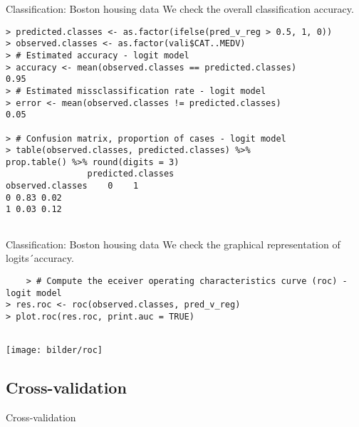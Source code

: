 \documentclass{beamer}
\begin{document}
\begin{frame}[fragile]{Classification: Boston housing data}
We check the overall classification accuracy. 
	\begin{lstlisting}	
> predicted.classes <- as.factor(ifelse(pred_v_reg > 0.5, 1, 0))
> observed.classes <- as.factor(vali$CAT..MEDV)
> # Estimated accuracy - logit model 
> accuracy <- mean(observed.classes == predicted.classes)
0.95
> # Estimated missclassification rate - logit model 
> error <- mean(observed.classes != predicted.classes)
0.05

> # Confusion matrix, proportion of cases - logit model 
> table(observed.classes, predicted.classes) %>% 
prop.table() %>% round(digits = 3)
                predicted.classes
observed.classes    0    1
0 0.83 0.02
1 0.03 0.12
	
	\end{lstlisting}
\end{frame}

\begin{frame}[fragile]{Classification: Boston housing data}
We check the graphical representation of logits´accuracy. 
	\begin{lstlisting}
	> # Compute the eceiver operating characteristics curve (roc) - logit model 
> res.roc <- roc(observed.classes, pred_v_reg)
> plot.roc(res.roc, print.auc = TRUE)
	
	\end{lstlisting}
	
\begin{center}
	\texttt{[image: bilder/roc]}
\end{center}	
\end{frame}



\subsection{Cross-validation}

\begin{frame}
	\begin{center}
		\Large{\textcolor{dkblue}{Cross-validation}}
	\end{center}
\end{frame}
\end{document}

